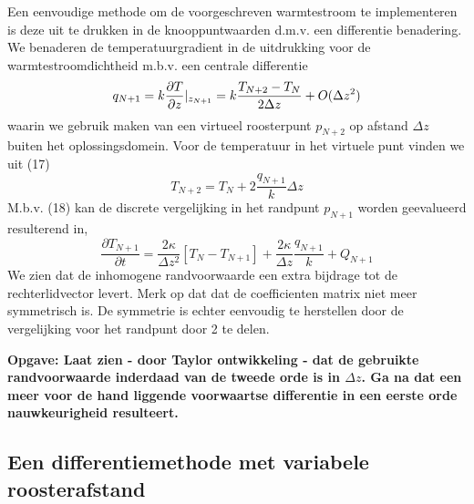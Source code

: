 Een eenvoudige methode om de voorgeschreven warmtestroom te
implementeren is deze uit te drukken in de knooppuntwaarden d.m.v.
een differentie benadering.
We benaderen de temperatuurgradient in de uitdrukking voor de
warmtestroomdichtheid m.b.v. een centrale differentie
\begin{equation}
q_{N+1} = k {\partial T \over \partial z} |_{z_{N+1}}
=
k \frac {T_{N+2} - T_{N}} { 2 \Delta z}
+
O( \Delta z  ^2 )
\end{equation}
waarin we gebruik maken van een virtueel roosterpunt $p_{N+2}$ op
afstand $\Delta z$ buiten het oplossingsdomein.
Voor de temperatuur in het virtuele punt vinden we uit (17)
\begin{equation}
T_{N+2} = T_{N} + 2 \frac {q_{N+1}} {k} \Delta z
\end{equation}
M.b.v. (18) kan de discrete vergelijking in het randpunt $p_{N+1}$
worden geevalueerd resulterend in,
\begin{equation}
\frac {\partial T_{N+1}} {\partial t} = 
\frac {2 \kappa} {\Delta z^2}
     \left [
             T_N - T_{N+1}
     \right ]
+
\frac {2 \kappa} {\Delta z}
\frac {q_{N+1}} {k} 
+
Q_{N+1}
\end{equation}
We zien dat de inhomogene randvoorwaarde een extra bijdrage tot de
rechterlidvector levert.
Merk op dat 
dat de coefficienten matrix niet meer symmetrisch is.
De symmetrie is echter eenvoudig te herstellen door de vergelijking
voor het randpunt door 2 te delen.

\vspace{0.5cm}
\noindent
\bf Opgave:\rm
\newline
\small
Laat zien - door Taylor ontwikkeling - dat de gebruikte
randvoorwaarde inderdaad van de tweede orde is in $\Delta z$.
Ga na dat een meer voor de hand liggende voorwaartse differentie
in een eerste orde nauwkeurigheid resulteert.
\normalsize



\subsection{Een differentiemethode met variabele roosterafstand}

